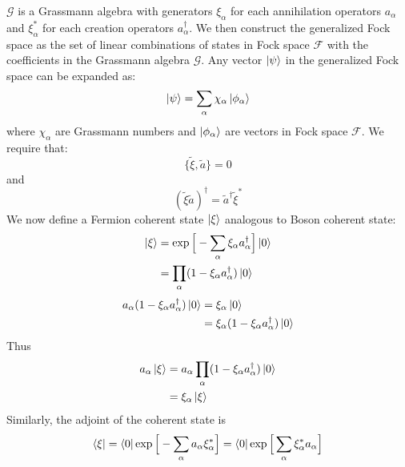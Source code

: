 \documentclass[12pt]{article}
\begin{document}
$\mathcal{G}$ is a Grassmann algebra with generators $\xi_\alpha$ for each 
annihilation operators $a_\alpha$ and $\xi^*_\alpha$ for each creation operators 
$a_\alpha^\dagger$. We then construct the generalized Fock space as the set of 
linear combinations of states in Fock space $\mathcal{F}$ with the coefficients 
in the Grassmann algebra  $\mathcal{G}$. Any vector $\ket{\psi}$ in the generalized 
Fock space can be expanded as:
\begin{equation*}
    \ket{\psi}=\sum_\alpha\chi_\alpha\ket{\phi_\alpha}
\end{equation*} 
where $\chi_\alpha$ are Grassmann numbers and $\ket{\phi_\alpha}$ are vectors 
in Fock space $\mathcal{F}$. We require that:
\begin{equation*}
    \{\tilde{\xi},\tilde{a}\}=0
\end{equation*}
and
\begin{equation*}
    (\tilde{\xi}\tilde{a})^\dagger=\tilde{a}^\dagger\tilde{\xi}^*
\end{equation*}
We now define a Fermion coherent state $\ket{\xi}$ analogous to Boson coherent 
state:
\begin{equation*}
    \begin{split}
        \ket{\xi}&=\exp\Big[-\sum_\alpha\xi_\alpha a^\dagger_\alpha\Big]\ket{0}\\
        &=\prod_\alpha(1-\xi_\alpha a^\dagger_\alpha)\ket{0}
    \end{split}
\end{equation*}
\begin{equation*}
    \begin{split}
        a_\alpha(1-\xi_\alpha a^\dagger_\alpha)\ket{0}&=\xi_\alpha\ket{0}\\
        &=\xi_\alpha(1-\xi_\alpha a^\dagger_\alpha)\ket{0}
    \end{split}
\end{equation*}
Thus
\begin{equation*}
    \begin{split}
        a_\alpha\ket{\xi}&=a_\alpha\prod_\alpha(1-\xi_\alpha a^\dagger_\alpha)\ket{0}\\
        &=\xi_\alpha\ket{\xi}
    \end{split}
\end{equation*}
Similarly, the adjoint of the coherent state is 
\begin{equation*}
    \bra{\xi}=\bra{0}\exp\Big[-\sum_\alpha a_\alpha\xi_\alpha^*\Big]
    =\bra{0}\exp\Big[\sum_\alpha\xi_\alpha^*a_\alpha\Big]
\end{equation*}
\end{document}
